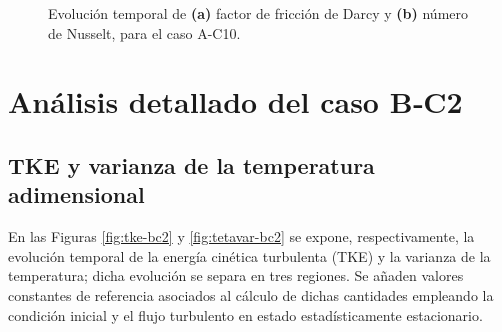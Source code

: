 \begin{figure}[H]
  \centering  
    
  \caption{Evolución temporal de \textbf{(a)} factor de fricción de Darcy y \textbf{(b)} número de Nusselt, para el caso A-C10.}
  \label{fig:ac10-1}
\end{figure}



\newpage
\section{Análisis detallado del caso B‑C2} \label{sec:bc2}

\subsection{TKE y varianza de la temperatura adimensional}
En las Figuras \ref{fig:tke-bc2} y \ref{fig:tetavar-bc2} se expone, respectivamente, la evolución temporal de la energía cinética turbulenta (TKE) y la varianza de la temperatura; dicha evolución se separa en tres regiones. Se añaden valores constantes de referencia asociados al cálculo de dichas cantidades empleando la condición inicial y el flujo turbulento en estado estadísticamente estacionario.

